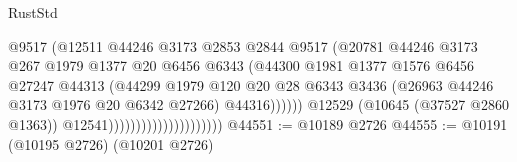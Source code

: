 \begin{lexlean}{RustStd}
\begin{coremodule}
                                                  @9517
                                                  (@12511
                                                    @44246
                                                    @3173
                                                    @2853
                                                    @2844
                                                    @9517
                                                    (@20781
                                                      @44246
                                                      @3173
                                                      @267
                                                      @1979
                                                      @1377
                                                      @20
                                                      @6456
                                                      @6343
                                                      (@44300
                                                        @1981
                                                        @1377
                                                        @1576
                                                        @6456
                                                        @27247
                                                        @44313
                                                        (@44299
                                                          @1979
                                                          @120
                                                          @20
                                                          @28
                                                          @6343
                                                          @3436
                                                          (@26963
                                                            @44246
                                                            @3173
                                                            @1976
                                                            @20
                                                            @6342
                                                            @27266)
                                                          @44316))))))
                                              @12529
                                              (@10645 (@37527 @2860 @1363))
                                              @12541)))))))))))))))))))))
@44551 := @10189 @2726
@44555 := @10191 (@10195 @2726) (@10201 @2726)

\end{coremodule}
\end{lexlean}
